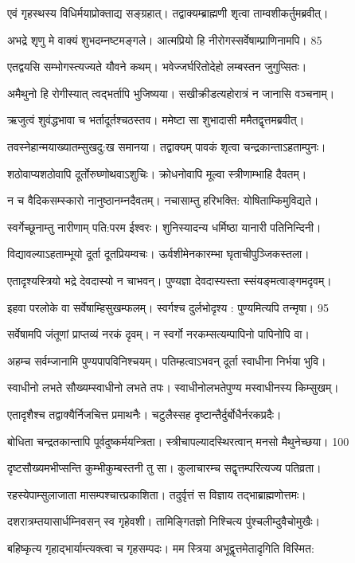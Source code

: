 एवं गृहस्थस्य विधिर्मयाप्रोक्ताद्य सङ्ग्रहात्।
तद्वाक्यम्ब्राह्मणी शृत्वा ताम्वशीकर्तुमब्रवीत्।

अभद्रे शृणु मे वाक्यं शुभदम्नष्टमङ्गले।
आत्मप्रियो हि नीरोगस्सर्वेषाम्प्राणिनामपि। 85

एतद्वयसि सम्भोगस्त्यज्यते यौवने कथम्।
भवेज्जर्घरितोदेहो लम्बस्तन जुगुप्सितः।

अमैथुनो हि रोगीस्यात् त्वद्भर्तापि भुजिष्यया।
सखीक्रीडत्यहोरात्रं न जानासि वञ्चनाम्।

ऋजुत्वं शुवंद्धभावा च भर्तादूर्तश्चठस्तव।
ममेष्टा सा शुभादासी ममैतद्वृत्तमब्रवीत्।

तवस्नेहान्मयाख्यातम्सुखदु:ख समानया।
तद्वाक्यम् पावकं शृत्वा चन्द्रकान्ताऽहताम्पुनः।

शठोवाप्यशठोवापि दूर्तोरुघ्णोथवाऽशुचिः।
क्रोधनोवापि मूल्वा स्त्रीणाम्भाहि दैवतम्।

न च वैदिकसम्स्कारो नानुष्ठानम्नदैवतम्।
नचासाम्तु हरिभक्ति: योषिताम्किमुविद्यते।

स्वर्गेच्छूनाम्तु नारीणाम् पति:परम ईश्वरः।
शुनिस्यादन्य धर्मिष्ठा यानारी पतिनिन्दिनी।

विद्यावल्याऽहताम्भूयो दूर्ता दूतप्रियम्वचः।
ऊर्वशीमेनकारम्भा घृताचीपुञ्जिकस्तला।

एतादृश्यस्त्रियो भद्रे देवदास्यो न चाभवन्।
पुण्यज्ञा देवदास्यस्ता स्संयङ्मत्वाङ्गमदृवम्।

इहवा परलोके वा सर्वेषाम्हिसुखम्फलम्।
स्वर्गश्च दुर्लभोदृश्य : पुण्यमित्यपि तन्मृषा। 95

सर्वेषामपि जंतूणां प्राप्तव्यं नरकं दृवम्।
न स्वर्गो नरकम्सत्यम्पापिनो पापिनोपि वा।

अहम्च सर्वम्जानामि पुण्यपापविनिश्चयम्।
पतिम्हत्वाऽभवन् दूर्ता स्वाधीना निर्भया भुवि।

स्वाधीनो लभते सौख्यम्स्वाधीनो लभते तपः।
स्वाधीनोलभतेपुण्य मस्वाधीनस्य किम्सुखम्।

एतादृशैश्च तद्वाक्यैर्निजचित्त प्रमाथनैः।
चटुलैस्सह दृष्टान्तैर्दुर्बोधैर्नरकप्रदैः।

बोधिता चन्द्रतकान्तापि पूर्वदुष्कर्मयन्त्रिता।
स्त्रीचापल्यादस्थिरत्वान् मनसो मैथुनेच्छया। 100

दृष्टसौख्यमभीप्सन्ति कुम्भीकुम्बस्तनी तु सा।
कुलाचारम्च सद्वृत्तम्परित्यज्य पतिव्रता।

रहस्येपाम्सुलाजाता मासम्पश्चात्त्प्रकाशिता।
तदुर्वृत्तं स विज्ञाय तद्भाब्राह्मणोत्तमः।

दशरात्रम्तयासार्धम्निवसन् स्व गृहेवशी।
तामिङ्गितज्ञो निश्चित्य पुंश्चलीम्दुवैचोमुखैः।

बहिष्कृत्य गृहाद्भार्याम्त्यक्त्वा च गृहसम्पदः।
मम स्त्रिया अभूद्वृत्तमेतादृगिति विस्मित:

